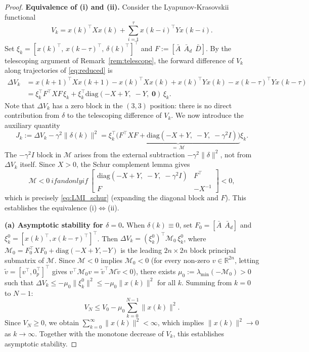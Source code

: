 \documentclass[10pt]{amsart}
\numberwithin{equation}{section}
\def\iff{~if and only if~}
\begin{document}
\begin{proof}
\textbf{Equivalence of (i) and (ii).}
Consider the Lyapunov-Krasovskii functional
\[
V_k = x(k)^\top X x(k) + \sum_{i=1}^\tau x(k-i)^\top Y x(k-i).
\]
Set $\xi_k = [x(k)^\top,\, x(k-\tau)^\top,\, \delta(k)^\top]^\top$ and
$F := [\bar{A}\ \ \bar{A}_d\ \ \bar{D}]$.
By the telescoping argument of Remark~\ref{rem:telescope}, the forward difference of
$V_k$ along trajectories of \eqref{eq:reduced} is
\begin{align*}
\Delta V_k
  &= x(k{+}1)^\top X x(k{+}1) - x(k)^\top X x(k)
     + x(k)^\top Y x(k) - x(k{-}\tau)^\top Y x(k{-}\tau) \\
  &= \xi_k^\top F^\top X F\,\xi_k
     + \xi_k^\top \mathrm{diag}(-X{+}Y,\;-Y,\;\mathbf{0})\,\xi_k.
\end{align*}
Note that $\Delta V_k$ has a zero block in the $(3,3)$ position: there is no direct
contribution from $\delta$ to the telescoping difference of $V_k$. We now introduce
the auxiliary quantity
\begin{equation}\label{eq:Jk}
J_k := \Delta V_k - \gamma^2\|\delta(k)\|^2
     = \xi_k^\top \underbrace{\bigl(F^\top X F
       + \mathrm{diag}(-X{+}Y,\;-Y,\;-\gamma^2 I)\bigr)}_{=\,\mathcal{M}}\xi_k.
\end{equation}
The $-\gamma^2 I$ block in $\mathcal{M}$ arises from the external subtraction
$-\gamma^2\|\delta\|^2$, not from $\Delta V_k$ itself. Since $X > 0$, the Schur
complement lemma gives
\[
\mathcal{M} < 0 \iff
\begin{bmatrix} \mathrm{diag}(-X{+}Y,\;-Y,\;-\gamma^2 I) & F^\top \\ F & -X^{-1}
\end{bmatrix} < 0,
\]
which is precisely \eqref{eq:LMI_schur} (expanding the diagonal block and $F$). This
establishes the equivalence (i)$\Leftrightarrow$(ii).

\textbf{(a) Asymptotic stability for $\delta=0$.}
When $\delta(k)\equiv 0$, set $F_0 = [\bar{A}\ \ \bar{A}_d]$ and
$\xi_k^0 = [x(k)^\top, x(k-\tau)^\top]^\top$. Then
$\Delta V_k = (\xi_k^0)^\top \mathcal{M}_0\,\xi_k^0$, where
$\mathcal{M}_0 = F_0^\top X F_0 + \mathrm{diag}(-X{+}Y,-Y)$
is the leading $2n\times 2n$ block principal submatrix of $\mathcal{M}$. Since
$\mathcal{M}<0$ implies $\mathcal{M}_0<0$ (for every non-zero $v \in \mathbb{R}^{2n}$,
letting $\tilde{v} = [v^\top,0_p^\top]^\top$ gives
$v^\top\mathcal{M}_0 v = \tilde{v}^\top\mathcal{M}\tilde{v} < 0$), there exists
$\mu_0 := \lambda_{\min}(-\mathcal{M}_0) > 0$ such that
$\Delta V_k \leq -\mu_0\|\xi_k^0\|^2 \leq -\mu_0\|x(k)\|^2$ for all $k$.
Summing from $k=0$ to $N-1$:
\[
V_N \leq V_0 - \mu_0\sum_{k=0}^{N-1}\|x(k)\|^2.
\]
Since $V_N \geq 0$, we obtain $\sum_{k=0}^{\infty}\|x(k)\|^2 < \infty$, which implies
$\|x(k)\|^2 \to 0$ as $k\to\infty$. Together with the monotone decrease of $V_k$,
this establishes asymptotic stability.


\end{proof}
\end{document}
